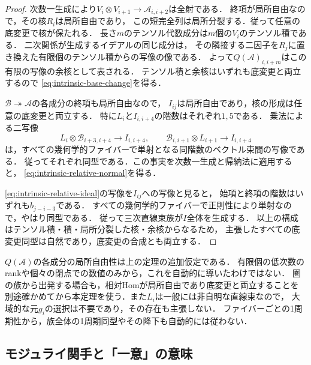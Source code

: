 \begin{proof}
次数一生成により$V_i\otimes V_{i+1}\to\mathcal A_{i,i+2}$は全射である．
終項が局所自由なので，その核$R_i$は局所自由であり，
この短完全列は局所分裂する．従って任意の底変更で核が保たれる．
長さ$m$のテンソル代数成分は$m$個の$V_i$のテンソル積である．
二次関係が生成するイデアルの同じ成分は，
その隣接する二因子を$R_j$に置き換えた有限個のテンソル積からの写像の像である．
よって$Q(\mathcal A)_{i,i+m}$はこの有限の写像の余核として表される．
テンソル積と余核はいずれも底変更と両立するので
\eqref{eq:intrinsic-base-change}を得る．

$\mathcal B\twoheadrightarrow\mathcal A$の各成分の終項も局所自由なので，
$I_{ij}$は局所自由であり，核の形成は任意の底変更と両立する．
特に$L_i$と$I_{i,i+4}$の階数はそれぞれ$1,5$である．
乗法による二写像
\begin{equation}
 L_i\otimes\mathcal B_{i+3,i+4}\longrightarrow I_{i,i+4},\qquad
 \mathcal B_{i,i+1}\otimes L_{i+1}\longrightarrow I_{i,i+4}
\end{equation}
は，すべての幾何学的ファイバーで単射となる同階数のベクトル束間の写像である．
従ってそれぞれ同型である．この事実を次数一生成と帰納法に適用すると，
\eqref{eq:intrinsic-relative-normal}を得る．

\eqref{eq:intrinsic-relative-ideal}の写像を$I_{ij}$への写像と見ると，
始項と終項の階数はいずれも$b_{j-i-3}$である．
すべての幾何学的ファイバーで正則性により単射なので，やはり同型である．
従って三次直線束族が$I$全体を生成する．
以上の構成はテンソル積・積・局所分裂した核・余核からなるため，
主張したすべての底変更同型は自然であり，底変更の合成とも両立する．
\end{proof}

\begin{remark}[族についての仮定を省略しない]
$Q(\mathcal A)$の各成分の局所自由性は上の定理の追加仮定である．
有限個の低次数のrankや個々の閉点での数値のみから，これを自動的に導いたわけではない．
圏の族から出発する場合も，相対Homが局所自由であり底変更と両立することを
別途確かめてから本定理を使う．また$L_i$は一般には非自明な直線束なので，
大域的な元$g_i$の選択は不要であり，その存在も主張しない．
ファイバーごとの1周期性から，族全体の1周期同型やその降下も自動的には従わない．
\end{remark}

\subsection{モジュライ関手と「一意」の意味}

